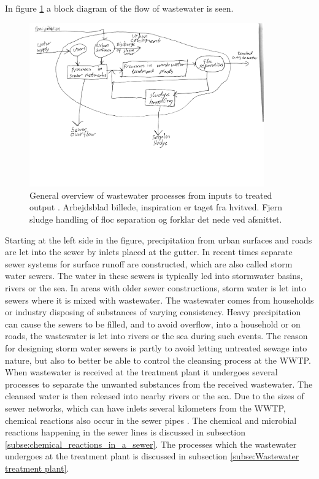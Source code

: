 In figure \ref{fig:sewer_overview_of_the_different_parts} a block diagram of the flow of wastewater is seen.
\begin{figure}[H]
\centering
\includegraphics[width=0.9\textwidth]{report/introduction/pictures/sewer_process2.pdf}
\caption{General overview of wastewater processes from inputs to treated output \cite{Sewer_processes}. Arbejdsblad billede, inspiration er taget fra hvitved. Fjern sludge handling of floc separation og forklar det nede ved afsnittet.}
\label{fig:sewer_overview_of_the_different_parts}
\end{figure}

Starting at the left side in the figure, precipitation from urban surfaces and roads are let into the sewer by inlets placed at the gutter. In recent times separate sewer systems for surface runoff are constructed, which are also called storm water sewers. The water in these sewers is typically led into stormwater basins, rivers or the sea. In areas with older sewer constructions, storm water is let into sewers where it is mixed with wastewater. The wastewater comes from households or industry disposing of substances of varying consistency. Heavy precipitation can cause the sewers to be filled, and to avoid overflow, into a household or on roads, the wastewater is let into rivers or the sea during such events. 
The reason for designing storm water sewers is partly to avoid letting untreated sewage into nature, but also to better be able to control the cleansing process at the WWTP. %
When wastewater is received at the treatment plant it undergoes several processes to separate the unwanted substances from the received wastewater. The cleansed water is then released into nearby rivers or the sea.
Due to the sizes of sewer networks, which can have inlets several kilometers from the WWTP, chemical reactions also occur in the sewer pipes \cite{Sewer_processes}.
The chemical and microbial reactions happening in the sewer lines is discussed in subsection \ref{subse:chemical_reactions_in_a_sewer}. The processes which the wastewater undergoes at the treatment plant is discussed in subsection \ref{subse:Wastewater treatment plant}.  

